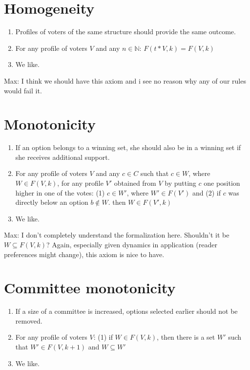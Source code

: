 \documentclass{article}
\begin{document}
\section{Homogeneity}
\begin{enumerate}
\item Profiles of voters of the same structure should provide the same outcome.
\item For any profile of voters $V$ and any $n \in \mathbb{N}$: $F(t*V, k)=F(V, k)$
\item We like.

\end{enumerate}

Max: {I think we should have this axiom and i see no reason why any of our rules would fail it.}

\section{Monotonicity}
\begin{enumerate}
\item If an option belongs to a winning set, she should also be in a winning set if she receives additional support.
\item For any profile of voters $V$ and any $c \in C$ such that $c \in W$, where $W \in F(V, k)$, for any profile $V'$ obtained from $V$ by putting $c$ one position higher in one of the votes: (1) $c \in W'$, where $W' \in F(V')$ and (2) if $c$ was directly below an option $b \notin W$. then $W \in F(V', k)$
\item We like.

\end{enumerate}

Max: {I don't completely understand the formalization here. Shouldn't it be $W\subseteq F(V,k)$? Again, especially given dynamics in application (reader preferences might change), this axiom is nice to have.}

\section{Committee monotonicity}
\begin{enumerate}
\item If a size of a committee is increased, options selected earlier should not be removed.
\item For any profile of voters $V$: (1) if $W \in F(V, k)$, then there is a set $W'$ such that $W' \in F(V, k+1)$ and $W \subseteq W'$
\item We like.

\end{enumerate}
\end{document}

